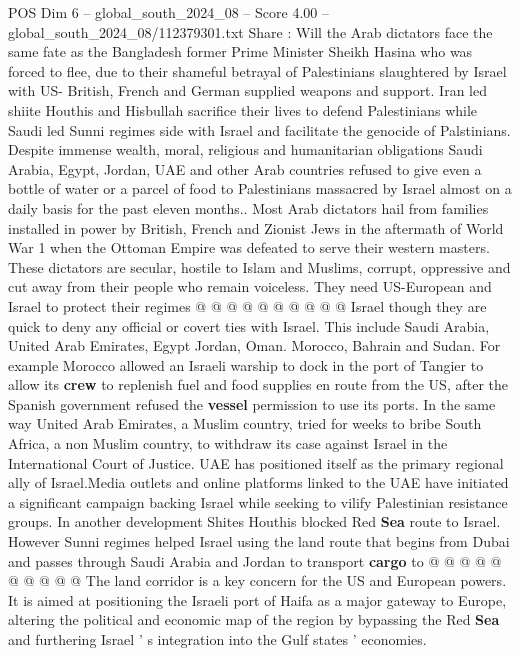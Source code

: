 \begin{textsample}{POS Dim 6 – global\_south\_2024\_08 – Score 4.00 – global\_south\_2024\_08/112379301.txt}  \label{ex:f6_pos_330}
Share : Will the Arab dictators face the same fate as the Bangladesh former Prime Minister Sheikh Hasina who was forced to flee, due to their shameful betrayal of Palestinians slaughtered by Israel with US- British, French and German supplied weapons and support.
Iran led shiite Houthis and Hisbullah sacrifice their lives to defend Palestinians while Saudi led Sunni regimes side with Israel and facilitate the genocide of Palstinians.
Despite immense wealth, moral, religious and humanitarian obligations Saudi Arabia, Egypt, Jordan, UAE and other Arab countries refused to give even a bottle of water or a parcel of food to Palestinians massacred by Israel almost on a daily basis for the past eleven months..
Most Arab dictators hail from families installed in power by British, French and Zionist Jews in the aftermath of World War 1 when the Ottoman Empire was defeated to serve their western masters.
These dictators are secular, hostile to Islam and Muslims, corrupt, oppressive and cut away from their people who remain voiceless.
They need US-European and Israel to protect their regimes @ @ @ @ @ @ @ @ @ @ Israel though they are quick to deny any official or covert ties with Israel.
This include Saudi Arabia, United Arab Emirates, Egypt Jordan, Oman.
Morocco, Bahrain and Sudan.
For example Morocco allowed an Israeli warship to dock in the port of Tangier to allow its \textbf{crew} to replenish fuel and food supplies en route from the US, after the Spanish government refused the \textbf{vessel} permission to use its ports.
In the same way United Arab Emirates, a Muslim country, tried for weeks to bribe South Africa, a non Muslim country, to withdraw its case against Israel in the International Court of Justice.
UAE has positioned itself as the primary regional ally of Israel.Media outlets and online platforms linked to the UAE have initiated a significant campaign backing Israel while seeking to vilify Palestinian resistance groups.
In another development Shites Houthis blocked Red \textbf{Sea} route to Israel.
However Sunni regimes helped Israel using the land route that begins from Dubai and passes through Saudi Arabia and Jordan to transport \textbf{cargo} to @ @ @ @ @ @ @ @ @ @ The land corridor is a key concern for the US and European powers.
It is aimed at positioning the Israeli port of Haifa as a major gateway to Europe, altering the political and economic map of the region by bypassing the Red \textbf{Sea} and furthering Israel ' s integration into the Gulf states ' economies.

\end{textsample}
